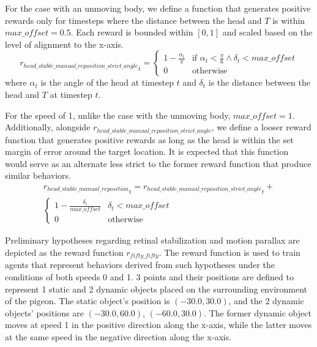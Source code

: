         For the case with an unmoving body, we define a function that generates positive rewards only for timesteps where the distance between the head and $T$ is within $max\_offset = 0.5$. Each reward is bounded within $[0, 1]$ and scaled based on the level of alignment to the x-axis.
          \begin{equation}
              {r_{head\_stable\_manual\_reposition\_strict\_angle}}_t =
              \begin{cases}
                  1 - \frac {\alpha_t} \pi & \text{if $\alpha_t < \frac \pi 6 \land \delta_t < max\_offset$} \\
                  0 & \text{otherwise}
              \end{cases}
          \end{equation}
        where $\alpha_t$ is the angle of the head at timestep $t$ and $\delta_t$ is the distance between the head and $T$ at timestep $t$.

        For the speed of 1, unlike the case with the unmoving body, $max\_offset = 1$.
        Additionally, alongside $r_{head\_stable\_manual\_reposition\_strict\_angle}$, we define a looser reward function that generates positive rewards as long as the head is within the set margin of error around the target location.
        It is expected that this function would serve as an alternate less strict to the former reward function that produce similar behaviors.
        \begin{equation}
          \begin{aligned}
            {r_{head\_stable\_manual\_reposition}}_t = {r_{head\_stable\_manual\_reposition\_strict\_angle}}_t + \\
              \begin{cases}
                  1 - \frac {\delta_t} {max\_offset} & \text{$\delta_t < max\_offset$} \\
                  0 & \text{otherwise}
              \end{cases}
          \end{aligned}
        \end{equation}

    Preliminary hypotheses regarding retinal stabilization and motion parallax are depicted as the reward function $r_{fifty\_fifty}$. The reward function is used to train agents that represent behaviors derived from such hypotheses under the conditions of both speeds 0 and 1.
      3 points and their positions are defined to represent 1 static and 2 dynamic objects placed on the surrounding environment of the pigeon.
      The static object's position is $(-30.0, 30.0)$, and the 2 dynamic objects' positions are $(-30.0, 60.0)$, $(-60.0, 30.0)$. The former dynamic object moves at speed 1 in the positive direction along the x-axis, while the latter moves at the same speed in the negative direction along the x-axis.

